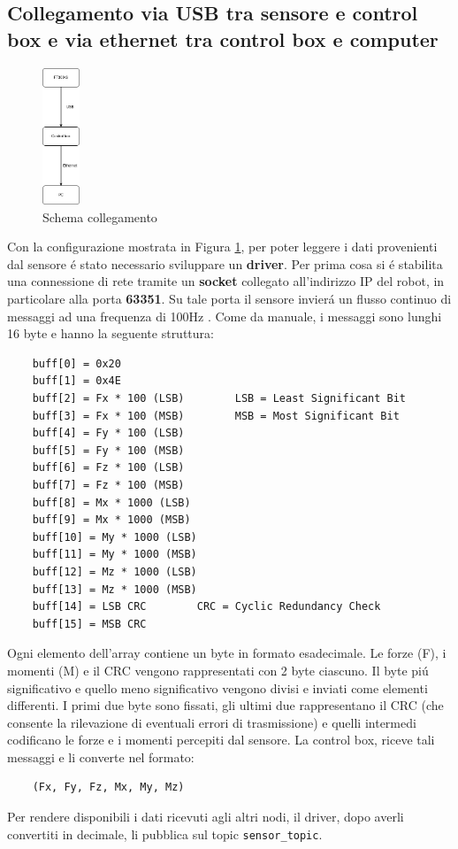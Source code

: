 \subsection{Collegamento via USB tra sensore e control box e via ethernet tra control box e computer}
\begin{figure}[H]
    \centering
    \includegraphics*[width=0.1\textwidth]{images/ft-cbox-pc.png}
    \caption{Schema collegamento}
    \label{fig:ft-cbox-pc}
\end{figure}
Con la configurazione mostrata in Figura \ref{fig:ft-cbox-pc}, per poter leggere i dati provenienti dal sensore \'{e} stato 
necessario sviluppare un \textbf{driver}. 
Per prima cosa si \'{e} stabilita una connessione di rete tramite un \textbf{socket} collegato all'indirizzo IP del robot, 
in particolare alla porta \textbf{63351}. 
Su tale porta il sensore invier\'{a} un flusso continuo di messaggi ad una frequenza di 100Hz \cite{ft_sensor}. 
Come da manuale, i messaggi sono lunghi 16 byte e hanno la seguente struttura: 
\begin{verbatim}
    buff[0] = 0x20
    buff[1] = 0x4E
    buff[2] = Fx * 100 (LSB)        LSB = Least Significant Bit
    buff[3] = Fx * 100 (MSB)        MSB = Most Significant Bit
    buff[4] = Fy * 100 (LSB)
    buff[5] = Fy * 100 (MSB)
    buff[6] = Fz * 100 (LSB)
    buff[7] = Fz * 100 (MSB)
    buff[8] = Mx * 1000 (LSB)
    buff[9] = Mx * 1000 (MSB)
    buff[10] = My * 1000 (LSB)
    buff[11] = My * 1000 (MSB)
    buff[12] = Mz * 1000 (LSB)
    buff[13] = Mz * 1000 (MSB)
    buff[14] = LSB CRC        CRC = Cyclic Redundancy Check
    buff[15] = MSB CRC
\end{verbatim} 
Ogni elemento dell'array contiene un byte in formato esadecimale. 
Le forze (F), i momenti (M) e il CRC vengono rappresentati con 2 byte ciascuno. Il byte pi\'{u} significativo e quello meno significativo 
vengono divisi e inviati come elementi differenti.
I primi due byte sono fissati, gli ultimi due rappresentano il CRC (che consente la rilevazione di eventuali errori di 
trasmissione) e quelli intermedi codificano le forze e i momenti percepiti dal sensore. 
La control box, riceve tali messaggi e li converte nel formato:
\begin{verbatim}
    (Fx, Fy, Fz, Mx, My, Mz)
\end{verbatim}
Per rendere disponibili i dati ricevuti agli altri nodi, il driver, dopo averli convertiti in decimale, li pubblica sul 
topic \verb|sensor_topic|.
